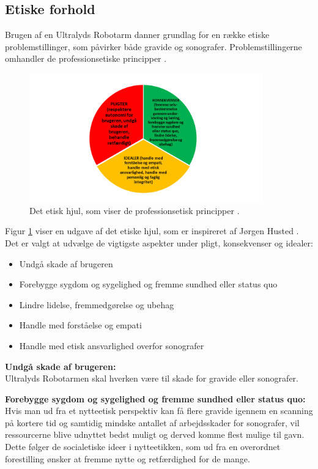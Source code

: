 \newpage
\subsection{Etiske forhold}
Brugen af en Ultralyds Robotarm danner grundlag for en række etiske problemstillinger, som påvirker både gravide og sonografer. 
Problemstillingerne omhandler de professionsetiske principper \cite{Husted}. 

\begin{figure}[H]\centering
	\includegraphics[width = 0.9\textwidth]{Figurer/Detetiskehjul}
	\caption{Det etisk hjul, som viser de professionsetisk principper \cite{Etiskehjul}.}
	\label{etiskhjul}
\end{figure}

Figur \ref{etiskhjul} viser en udgave af det etiske hjul, som er inspireret af Jørgen Husted \cite{Etiskehjul}. Det er valgt at udvælge de vigtigste aspekter under pligt, konsekvenser og idealer: 
\begin{itemize}
		\item Undgå skade af brugeren
		\item Forebygge sygdom og sygelighed og fremme sundhed eller status quo
		\item Lindre lidelse, fremmedgørelse og ubehag
		\item Handle med forståelse og empati
		\item Handle med etisk ansvarlighed overfor sonografer 
\end{itemize} 

\textbf{Undgå skade af brugeren:} \\
Ultralyds Robotarmen skal hverken være til skade for gravide eller sonografer.

\textbf{Forebygge sygdom og sygelighed og fremme sundhed eller status quo:} \\
Hvis man ud fra et nytteetisk perspektiv kan få flere gravide igennem en scanning på kortere tid og samtidig mindske antallet af arbejdsskader for sonografer, vil ressourcerne blive udnyttet bedst muligt og derved komme flest mulige til gavn. Dette følger de socialetiske ideer i nytteetikken, som ud fra en overordnet forestilling ønsker at fremme nytte og retfærdighed for de mange.
    
